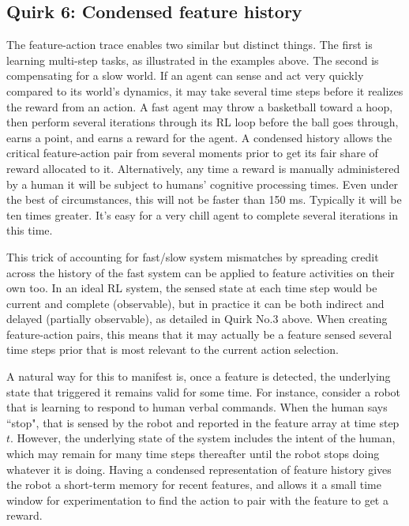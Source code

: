 \subsection*{Quirk 6: Condensed feature history}
\label{algofeaturetrace}

The feature-action trace enables two similar but distinct things.
The first is learning multi-step tasks, as illustrated in the examples above.
The second is compensating for a slow world. If an agent can sense and act very
quickly compared to its world's dynamics, it may take several time steps
before it realizes the reward from an action. A fast agent may throw a
basketball toward a hoop, then perform several iterations through its
RL loop before the ball goes through, earns a point, and earns a reward for the
agent. A condensed history allows the critical feature-action pair from
several moments prior to get its fair share of reward allocated to it.
Alternatively, any time a reward is manually administered by a human
it will be subject to humans' cognitive processing times. Even under the
best of circumstances, this will not be faster than 150 ms. Typically it will
be ten times greater. It's easy for a very chill agent to complete
several iterations in this time.

This trick of accounting for fast/slow system mismatches by spreading
credit across the history of the fast system can be applied to
feature activities on their own too. In an ideal RL system, the sensed
state at each time step would be current and complete (observable),
but in practice it can be both indirect and delayed (partially observable),
as detailed in Quirk No.3 above. When creating feature-action pairs,
this means that it may actually be a feature sensed several time steps
prior that is most relevant to the current action selection.

A natural way for this to manifest is, once a feature is detected,
the underlying state that triggered it remains valid for some time.
For instance, consider a robot that is learning to respond to human
verbal commands. When the human says ``stop", that is sensed by
the robot and reported in the feature array at time step $t$.
However, the underlying state of the system includes the intent of
the human, which may remain for many time steps thereafter until
the robot stops doing whatever it is doing.
Having a condensed representation of feature history gives the robot
a short-term memory for recent features, and allows it a small time
window for experimentation to find the action to pair with the feature
to get a reward.

